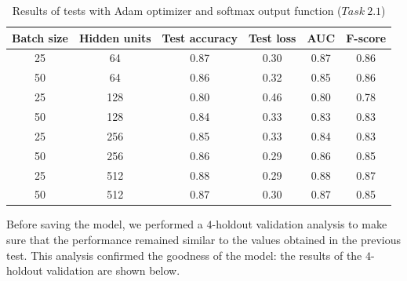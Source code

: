 \documentclass[11pt,a4paper,oneside]{article}
\begin{document}
\begin{table}[h]
\centering
\begin{tabular}{|cc|cccc|}
\hline
Batch size & Hidden units & Test accuracy & Test loss & AUC & F-score \\
\hline
25 & 64 & 0.87 & 0.30 & 0.87 & 0.86 \\ 
50 & 64 & 0.86 & 0.32 & 0.85 & 0.86 \\ 
25 & 128 & 0.80 & 0.46 & 0.80 & 0.78 \\ 
50 & 128 & 0.84 & 0.33 & 0.83 & 0.83 \\ 
25 & 256 & 0.85 & 0.33 & 0.84 & 0.83 \\ 
50 & 256 & 0.86 & 0.29 & 0.86 & 0.85 \\ 
25 & 512 & 0.88 & 0.29 & 0.88 & 0.87 \\ 
50 & 512 & 0.87 & 0.30 & 0.87 & 0.85 \\
\hline
\end{tabular}
\caption{Results of tests with Adam optimizer and softmax output function ($Task\ 2.1$)}
\end{table}

Before saving the model, we performed a $4$-holdout validation analysis to make sure that the performance remained similar to the values obtained in the previous test. 
This analysis confirmed the goodness of the model: the results of the $4$-holdout validation are shown below.

\clearpage
\end{document}
